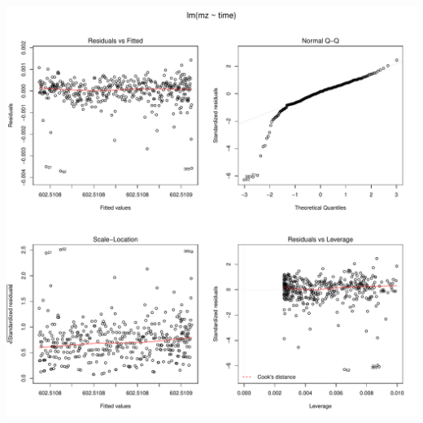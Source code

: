 \documentclass[]{article}
\begin{document}
\includegraphics{Supplementary_document_files/figure-latex/fit.lin.602-1.pdf}
\end{document}
